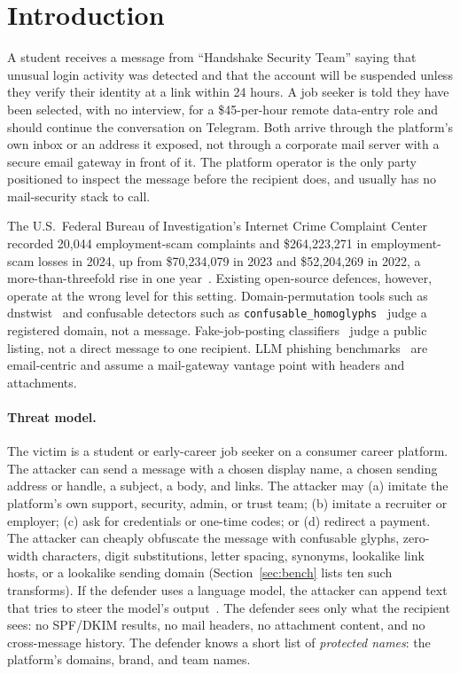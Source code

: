 \documentclass[10pt,twocolumn]{article}
\newcommand{\code}[1]{\texttt{#1}}
\begin{document}
\section{Introduction}
\label{sec:intro}

A student receives a message from ``Handshake Security Team'' saying that unusual login activity was detected and that the account will be suspended unless they verify their identity at a link within 24 hours. A job seeker is told they have been selected, with no interview, for a \$45-per-hour remote data-entry role and should continue the conversation on Telegram. Both arrive through the platform's own inbox or an address it exposed, not through a corporate mail server with a secure email gateway in front of it. The platform operator is the only party positioned to inspect the message before the recipient does, and usually has no mail-security stack to call.

The U.S.\ Federal Bureau of Investigation's Internet Crime Complaint Center recorded 20,044 employment-scam complaints and \$264,223,271 in employment-scam losses in 2024, up from \$70,234,079 in 2023 and \$52,204,269 in 2022, a more-than-threefold rise in one year~\cite{ic3_2024}. Existing open-source defences, however, operate at the wrong level for this setting. Domain-permutation tools such as dnstwist~\cite{dnstwist} and confusable detectors such as \code{confusable\_homoglyphs}~\cite{confusablehomoglyphs} judge a registered domain, not a message. Fake-job-posting classifiers~\cite{vidros2017recruitment} judge a public listing, not a direct message to one recipient. LLM phishing benchmarks~\cite{yang2025fraudr1,pajola2025ephishgen} are email-centric and assume a mail-gateway vantage point with headers and attachments.

\paragraph{Threat model.}
The victim is a student or early-career job seeker on a consumer career platform. The attacker can send a message with a chosen display name, a chosen sending address or handle, a subject, a body, and links. The attacker may (a) imitate the platform's own support, security, admin, or trust team; (b) imitate a recruiter or employer; (c) ask for credentials or one-time codes; or (d) redirect a payment. The attacker can cheaply obfuscate the message with confusable glyphs, zero-width characters, digit substitutions, letter spacing, synonyms, lookalike link hosts, or a lookalike sending domain (Section~\ref{sec:bench} lists ten such transforms). If the defender uses a language model, the attacker can append text that tries to steer the model's output~\cite{greshake2023indirect,owasp_llm01}. The defender sees only what the recipient sees: no SPF/DKIM results, no mail headers, no attachment content, and no cross-message history. The defender knows a short list of \emph{protected names}: the platform's domains, brand, and team names.
\end{document}
